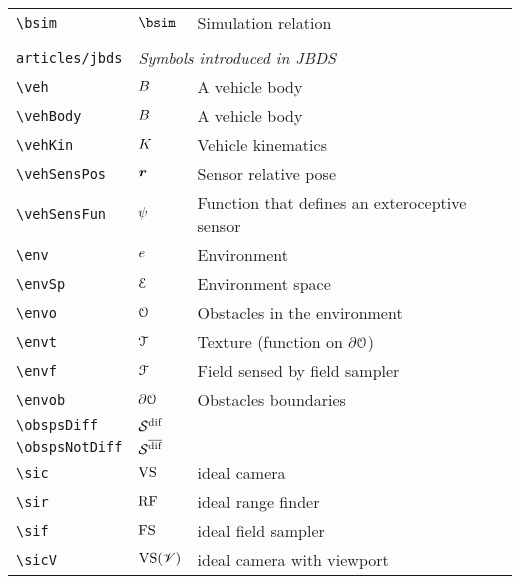 \begin{longtable}{lll}
 {\color[rgb]{0.5,0.5,0.5}\texttt{\textbackslash bsim}} & $\bsim$ &  Simulation relation\\ 
  &  & \\ 
 {\color[rgb]{0.5,0.5,0.5}\texttt{articles/jbds}} & \multicolumn{2}{l}{\emph{Symbols introduced in JBDS}}\\ 
 \hline
{\color[rgb]{0.5,0.5,0.5}\texttt{\textbackslash veh}} & $B$ &  A vehicle body\\ 
 {\color[rgb]{0.5,0.5,0.5}\texttt{\textbackslash vehBody}} & $B$ &  A vehicle body\\ 
 {\color[rgb]{0.5,0.5,0.5}\texttt{\textbackslash vehKin}} & $K$ &  Vehicle kinematics \\ 
 {\color[rgb]{0.5,0.5,0.5}\texttt{\textbackslash vehSensPos}} & $\boldsymbol{r}$ &  Sensor relative pose\\ 
 {\color[rgb]{0.5,0.5,0.5}\texttt{\textbackslash vehSensFun}} & $\psi$ &  Function that defines an exteroceptive sensor\\ 
 {\color[rgb]{0.5,0.5,0.5}\texttt{\textbackslash env}} & $e$ &  Environment\\ 
 {\color[rgb]{0.5,0.5,0.5}\texttt{\textbackslash envSp}} & $\mathcal{E}$ &  Environment space\\ 
 {\color[rgb]{0.5,0.5,0.5}\texttt{\textbackslash envo}} & $\mathcal{O}$ &  Obstacles in the environment\\ 
 {\color[rgb]{0.5,0.5,0.5}\texttt{\textbackslash envt}} & $\mathcal{T}$ &  Texture (function on $\partial \mathcal{O}$)\\ 
 {\color[rgb]{0.5,0.5,0.5}\texttt{\textbackslash envf}} & $\mathcal{F}$ &  Field sensed by field sampler\\ 
 {\color[rgb]{0.5,0.5,0.5}\texttt{\textbackslash envob}} & $\partial \mathcal{O}$ &  Obstacles boundaries\\ 
 {\color[rgb]{0.5,0.5,0.5}\texttt{\textbackslash obspsDiff}} & $\obspsDiff$ & \\ 
 {\color[rgb]{0.5,0.5,0.5}\texttt{\textbackslash obspsNotDiff}} & $\obspsNotDiff$ & \\ 
 {\color[rgb]{0.5,0.5,0.5}\texttt{\textbackslash sic}} & $\text{VS}$ &  ideal camera\\ 
 {\color[rgb]{0.5,0.5,0.5}\texttt{\textbackslash sir}} & $\text{RF}$ &  ideal range finder\\ 
 {\color[rgb]{0.5,0.5,0.5}\texttt{\textbackslash sif}} & $\text{FS}$ &  ideal field sampler\\ 
 {\color[rgb]{0.5,0.5,0.5}\texttt{\textbackslash sicV}} & $\text{VS}(\mathscr{V})$ &  ideal camera with viewport\\ 

\end{longtable}
